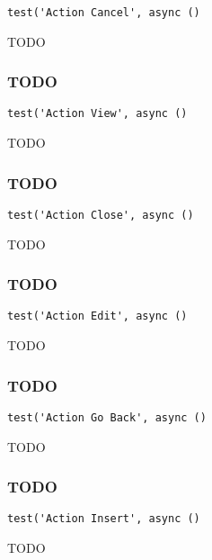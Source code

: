 \documentclass[a4paper]{article}
\begin{document}
\begin{lstlisting}
test('Action Cancel', async ()
\end{lstlisting}

TODO

\hypertarget{toc560}{}
\subsubsection{TODO}

\begin{lstlisting}
test('Action View', async ()
\end{lstlisting}

TODO

\hypertarget{toc561}{}
\subsubsection{TODO}

\begin{lstlisting}
test('Action Close', async ()
\end{lstlisting}

TODO

\hypertarget{toc562}{}
\subsubsection{TODO}

\begin{lstlisting}
test('Action Edit', async ()
\end{lstlisting}

TODO

\hypertarget{toc563}{}
\subsubsection{TODO}

\begin{lstlisting}
test('Action Go Back', async ()
\end{lstlisting}

TODO

\hypertarget{toc564}{}
\subsubsection{TODO}

\begin{lstlisting}
test('Action Insert', async ()
\end{lstlisting}

TODO
\end{document}
